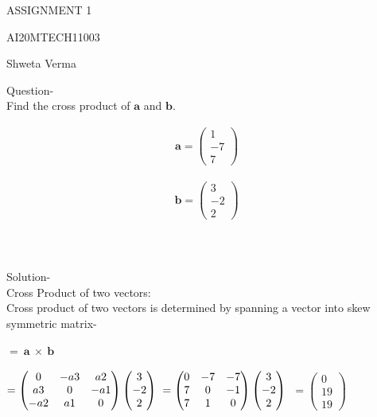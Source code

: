 \documentclass[11pt]{article}
\newcommand{\myvec}[1]{\ensuremath{\begin{pmatrix}#1\end{pmatrix}}}
\renewcommand{\vec}[1]{\boldsymbol{#1}}
\begin{document}
\begin{center}
\large ASSIGNMENT 1

AI20MTECH11003

Shweta Verma
\\
\end{center}
\large Question-
\\
Find the cross product of $\boldsymbol{a}$ and $\boldsymbol{b}$.


\begin{align*}
\vec{a} = \myvec{1\\-7\\7}
\end{align*}


\begin{align*}
\vec{b} = \myvec{3\\-2\\2}
\end{align*}
\\
\\
\\
\large Solution-
\\
Cross Product of two vectors: 
\\
Cross product of two vectors is determined by spanning a vector into skew symmetric matrix-
\\
\\
$\boldsymbol{ = ~a ~\times~ b}$
\\
\\
$
=\myvec
   {0 & -a3 & a2\\
   a3 & 0 & -a1\\
   -a2 & a1 & 0\\}
  \myvec{3\\-2\\2}
\\
\\
\\
$
$
= \myvec
  {0 & -7 & -7\\
  7 & 0 & -1\\
  7 & 1 & 0\\}
 \myvec{3\\-2\\2}
\\
\\
\\
$
$
=\myvec{0\\19\\19}
$
\end{document}
